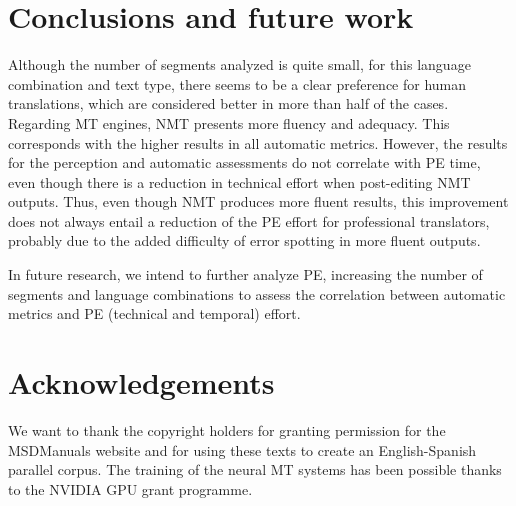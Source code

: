 \documentclass[output=paper]{langsci/langscibook}
\begin{document}
\begin{table}
\begin{floatrow}\captionsetup{margin=.1\textwidth}
%
{\caption{\label{technical post-editing} Technical effort (keystrokes/segment).}}
\end{floatrow}
\end{table}

\section{Conclusions and future work} \label{Conclusionsandfuturework}
Although the number of segments analyzed is quite small, for this language combination and text type, there seems to be a clear preference for human translations, which are considered better in more than half of the cases. Regarding MT engines, NMT presents more fluency and adequacy. This corresponds with the higher results in all automatic metrics. However, the results for the perception and automatic assessments do not correlate with PE time, even though there is a reduction in technical effort when post-editing NMT outputs. Thus, even though NMT produces more fluent results, this improvement does not always entail a reduction of the PE effort for professional translators, probably due to the added difficulty of error spotting in more fluent outputs.

In future research, we intend to further analyze PE, increasing the number of segments and language combinations to assess the correlation between automatic metrics and PE (technical and temporal) effort.


\section*{Acknowledgements}
We want to thank the copyright holders for granting permission for the MSDManuals website and for using these texts to create an English-Spanish parallel corpus. The training of the neural MT systems has been possible thanks to the NVIDIA GPU grant programme.

{\sloppy\printbibliography[heading=subbibliography,notkeyword=this]}
\end{document}
